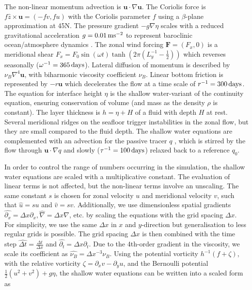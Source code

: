 The non-linear momentum advection is $\mathbf{u} \cdot \nabla\mathbf{u}$. The Coriolis force is
$f\hat{z} \times \mathbf{u} = (-fv,fu)$ with the Coriolis parameter $f$ using a $\beta$-plane approximation at 45\textdegree{}N.
The pressure gradient $-g\nabla \eta$ scales with a reduced gravitational acceleration $g = 0.01\operatorname{ms}^{-2}$ to represent
baroclinic ocean/atmosphere dynamics \citep{Gill1982}. The zonal wind forcing $\mathbf{F} = (F_x,0)$ is a meridional shear
$F_x = F_0\sin(\omega t) \tanh(2\pi(L_y^{-1} - \tfrac{1}{2}))$ which reverses seasonally ($\omega^{-1} = 365\operatorname{days}$).
Lateral diffusion of momentum is described by $\nu_B\nabla^4\mathbf{u}$, with biharmonic viscosity coefficient $\nu_B$.
Linear bottom friction is represented by $-r\mathbf{u}$ which decelerates the flow at a time scale of $r^{-1} = 300\operatorname{days}$.
The equation for interface height $\eta$ is the shallow water-variant of the continuity equation, ensuring conservation of volume
(and mass as the density $\rho$ is constant). The layer thickness is $h = \eta + H$ of a fluid with depth $H$ at rest.
Several meridional ridges on the seafloor trigger instabilities in the zonal flow, but they are small compared to the fluid depth.
The shallow water equations are complemented with an advection for the passive tracer $q$ , which is stirred by the flow
through $\mathbf{u} \cdot \nabla q$ and slowly ($\tau^{-1} = 100\operatorname{days}$) relaxed back to a reference $q_0$.

In order to control the range of numbers occurring in the simulation, the shallow water equations are scaled with a multiplicative
constant. The evaluation of linear terms is not affected, but the non-linear terms involve an unscaling. The same constant $s$
is chosen for zonal velocity $u$  and meridional velocity $v$, such that $\hat{u} = su$ and $\hat{v} = sv$.
Additionally, we use dimensionless spatial gradients $\hat{\partial_x} = \Delta x \partial_x, \hat{\nabla} = \Delta x \nabla$, etc.
by scaling the equations with the grid spacing $\Delta x$. For simplicity, we use the same $\Delta x$ in $x$ and $y$-direction
but generalisation to less regular grids is possible. The grid spacing $\Delta x$ is then combined with the time step
$\widehat{\Delta t} = \tfrac{\Delta t}{\Delta x}$ and $\hat{\partial_t} = \Delta x \partial_t$. Due to the 4th-order gradient in the
viscosity, we scale its coefficient as $\hat{\nu_B} = \Delta x^{-3}\nu_B$. Using the potential vorticity $h^{-1}(f + \zeta)$,
with the relative vorticity $\zeta = \partial_xv - \partial_yu$, and the Bernoulli potential $\tfrac{1}{2}(u^2 + v^2) + g\eta$,
the shallow water equations can be written into a scaled form as

